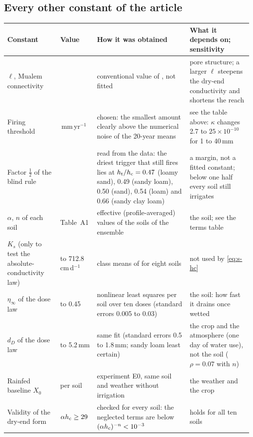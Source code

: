 \subsection{Every other constant of the article}
{\small\begin{longtable}{>{\raggedright\arraybackslash}p{}>{\raggedright\arraybackslash}p{}>{\raggedright\arraybackslash}p{}>{\raggedright\arraybackslash}p{}}
\toprule Constant & Value & How it was obtained & What it depends on; sensitivity\\\midrule\endhead
$\ell$, Mualem connectivity & 0.5 & conventional value of \citet{Mualem1976}, not fitted & pore structure; a larger $\ell$ steepens the dry-end conductivity and shortens the reach\\
Firing threshold & 5\,mm\,yr$^{-1}$ & chosen: the smallest amount clearly above the numerical noise of the 20-year means & see the table above: $\kappa$ changes 2.7 to $25\times10^{-10}$ for 1 to 40\,mm\\
Factor $\tfrac12$ of the blind rule & 0.5 & read from the data: the driest trigger that still fires lies at $h_{\mathrm{t}}/h_{\mathrm{c}}=0.47$ (loamy sand), 0.49 (sandy loam), 0.50 (sand), 0.54 (loam) and 0.66 (sandy clay loam) & a margin, not a fitted constant; below one half every soil still irrigates\\
$\alpha$, $n$ of each soil & Table~A1 & effective (profile-averaged) values of the soils of the ensemble & the soil; see the terms table\\
$K_s$ (only to test the absolute-conductivity law) & 1.68 to 712.8\,cm\,d$^{-1}$ & class means of \citet{Carsel1988} for eight soils & not used by \cref{eq:s-hc}\\
$\eta_\infty$ of the dose law & 0.10 to 0.45 & nonlinear least squares per soil over ten doses (standard errors 0.005 to 0.03) & the soil: how fast it drains once wetted\\
$d_D$ of the dose law & 3.2 to 5.2\,mm & same fit (standard errors 0.5 to 1.8\,mm; sandy loam least certain) & the crop and the atmosphere (one day of water use), not the soil ($\rho=0.07$ with $n$)\\
Rainfed baseline $X_0$ & per soil & experiment E0, same soil and weather without irrigation & the weather and the crop\\
Validity of the dry-end form & $\alpha h_{\mathrm{c}}\ge29$ & checked for every soil: the neglected terms are below $(\alpha h_{\mathrm{c}})^{-n}<10^{-3}$ & holds for all ten soils\\\bottomrule
\end{longtable}}
